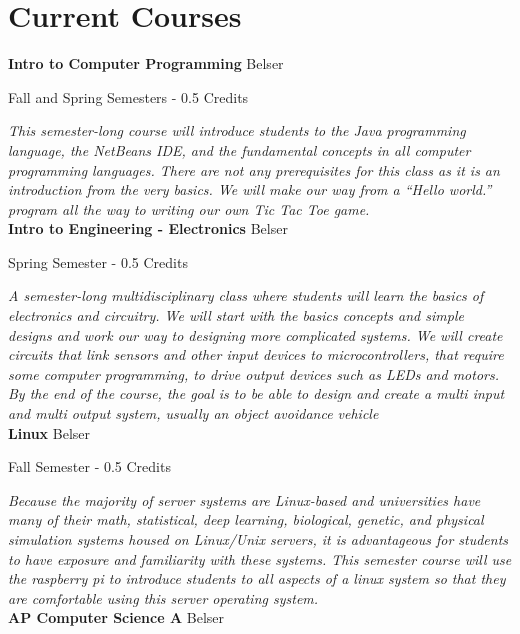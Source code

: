 \section{Current Courses}

\noindent\textbf{Intro to Computer Programming} \hfill Belser

\noindent Fall and Spring Semesters - 0.5 Credits

\vspace{1mm}\emph{This semester-long course will introduce students to the Java programming language, the NetBeans IDE, and the fundamental concepts in all computer programming languages. There are not any prerequisites for this class as it is an introduction from the very basics. We will make our way from a “Hello world.” program all the way to writing our own Tic Tac Toe game.}\\


\noindent\textbf{Intro to Engineering - Electronics} \hfill Belser

\noindent Spring Semester - 0.5 Credits

\vspace{1mm}\emph{A semester-long multidisciplinary class where students will learn the basics of electronics and circuitry. We will start with the basics concepts and simple designs and work our way to designing more complicated systems. We will create circuits that link sensors and other input devices to microcontrollers, that require some computer programming, to drive output devices such as LEDs and motors. By the end of the course, the goal is to be able to design and create a multi input and multi output system, usually an object avoidance vehicle}\\


\noindent\textbf{Linux} \hfill Belser

\noindent Fall Semester - 0.5 Credits

\vspace{1mm}\emph{Because the majority of server systems are Linux-based and universities have many of their math, statistical, deep learning, biological, genetic, and physical simulation systems housed on Linux/Unix servers, it is advantageous for students to have exposure and familiarity with these systems. This semester course will use the raspberry pi to introduce students to all aspects of a linux system so that they are comfortable using this server operating system.}\\


\noindent\textbf{AP Computer Science A} \hfill Belser

